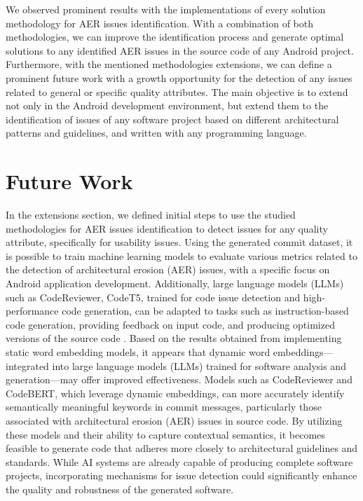 We observed prominent results with the implementations of every solution methodology for AER issues identification. With a combination of both methodologies, we can improve the identification process and generate optimal solutions to any identified AER issues in the source code of any Android project. Furthermore, with the mentioned methodologies extensions, we can define a prominent future work with a growth opportunity for the detection of any issues related to general or specific quality attributes. The main objective is to extend not only in the Android development environment, but extend them to the identification of issues of any software project based on different architectural patterns and guidelines, and written with any programming language.


\section{Future Work}
In the extensions section, we defined initial steps to use the studied methodologies for AER issues identification to detect issues for any quality attribute, specifically for usability issues. Using the generated commit dataset, it is possible to train machine learning models to evaluate various metrics related to the detection of architectural erosion (AER) issues, with a specific focus on Android application development. Additionally, large language models (LLMs) such as CodeReviewer, CodeT5, trained for code issue detection and high-performance code generation, can be adapted to tasks such as instruction-based code generation, providing feedback on input code, and producing optimized versions of the source code \cite{codereviewer,codebert,codet5}.
Based on the results obtained from implementing static word embedding models, it appears that dynamic word embeddings—integrated into large language models (LLMs) trained for software analysis and generation—may offer improved effectiveness. Models such as CodeReviewer and CodeBERT, which leverage dynamic embeddings, can more accurately identify semantically meaningful keywords in commit messages, particularly those associated with architectural erosion (AER) issues in source code. By utilizing these models and their ability to capture contextual semantics, it becomes feasible to generate code that adheres more closely to architectural guidelines and standards. While AI systems are already capable of producing complete software projects, incorporating mechanisms for issue detection could significantly enhance the quality and robustness of the generated software.
